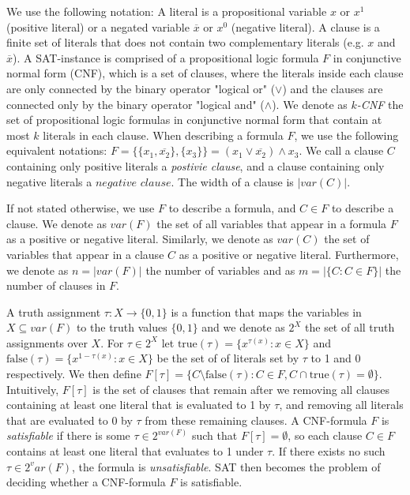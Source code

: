 \documentclass[11pt,a4paper]{article}
\theoremstyle{definition}
\theoremstyle{proposition}
\begin{document}
We use the following notation: A literal is a propositional variable $x$ or $x^1$ (positive literal) or a negated variable $\overline{x}$ or $x^0$ (negative literal). A clause is a finite set of literals that does not contain two complementary literals (e.g. $x$ and $\overline{x}$). A SAT-instance is comprised of a propositional logic formula $F$ in conjunctive normal form (CNF), which is a set of clauses, where the literals inside each clause are only connected by the binary operator "logical or" ($\lor$) and the clauses are connected only by the binary operator "logical and" ($\land$). We denote as \textit{$k$-CNF} the set of propositional logic formulas in conjunctive normal form that contain at most $k$ literals in each clause. When describing a formula $F$, we use the following equivalent notations: $F = \{ \{x_1, \overline{x_2}\}, \{x_3\} \} = (x_1 \lor \overline{x_2}) \land x_3$. We call a clause $C$ containing only positive literals a \textit{postivie clause}, and a clause containing only negative literals a $\textit{negative clause}$. The width of a clause is $|var(C)|$. 

If not stated otherwise, we use $F$ to describe a formula, and $C \in F$ to describe a clause. We denote as $var(F)$ the set of all variables that appear in a formula $F$ as a positive or negative literal. Similarly, we denote as $var(C)$ the set of variables that appear in a clause $C$ as a positive or negative literal. Furthermore, we denote as $n = |var(F)|$ the number of variables and as $m = |\{C \colon C \in F \}|$ the number of clauses in $F$.  

A truth assignment $\tau: X \to \{0,1\}$ is a function that maps the variables in $X \subseteq var(F)$ to the truth values $\{0,1\}$ and we denote as $2^X$ the set of all truth assignments over $X$. For $\tau \in 2^X$ let $\text{true}(\tau) = \{x^{\tau(x)} \colon x \in X\}$ and $\text{false}(\tau) = \{x^{1-\tau(x)} \colon x \in X\}$ be the set of of literals set by $\tau$ to 1 and 0 respectively. We then define $F[\tau] = \{ C \setminus \text{false}(\tau) \colon C \in F, C \cap \text{true}(\tau) = \emptyset \}$. Intuitively, $F[\tau]$ is the set of clauses that remain after we removing all clauses containing at least one literal that is evaluated to 1 by $\tau$, and removing all literals that are evaluated to 0 by $\tau$ from these remaining clauses. A CNF-formula $F$ is \textit{satisfiable} if there is some $\tau \in 2^{var(F)}$ such that $F[\tau] = \emptyset$, so each clause $C \in F$ contains at least one literal that evaluates to 1 under $\tau$. If there exists no such $\tau \in 2^var(F)$, the formula is \textit{unsatisfiable}. SAT then becomes the problem of deciding whether a CNF-formula $F$ is satisfiable. 
\end{document}
